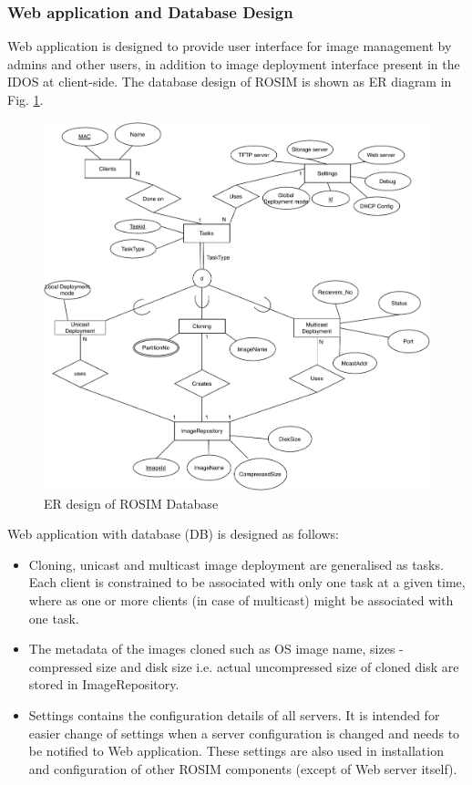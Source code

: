 \documentclass[a4paper,12pt]{article}
\begin{document}
\subsubsection{ Web application and Database Design}
Web application is designed to provide user interface for image management by admins and other users, in addition to image deployment interface present in the IDOS at client-side. The database design of ROSIM is shown as ER diagram in Fig. \ref{DB}. 
\begin{figure}[]
    \centering
    \includegraphics[width=\linewidth]{DB.pdf}
    \caption{ER design of ROSIM Database}
    \label{DB}
\end{figure}
Web application with database (DB) is designed as follows:
\begin{itemize}
    \item Cloning, unicast and multicast image deployment are generalised as tasks. Each client is constrained to be associated with only one task at a given time, where as one or more clients (in case of multicast) might be  associated with one task.
    \item The metadata of the images cloned such as OS image name, sizes - compressed size and disk size i.e. actual uncompressed size of cloned disk are stored in ImageRepository.
    \item Settings contains the configuration details of all servers. It is intended for easier change of settings when a server configuration is changed and needs to be notified to Web application. These settings are also used in installation and configuration of other ROSIM components (except of Web server itself).
\end{itemize}
\end{document}
